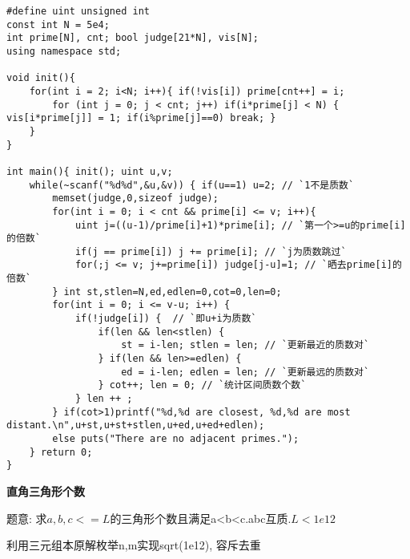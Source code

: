 \begin{lstlisting}
#define uint unsigned int
const int N = 5e4;
int prime[N], cnt; bool judge[21*N], vis[N];
using namespace std;

void init(){
    for(int i = 2; i<N; i++){ if(!vis[i]) prime[cnt++] = i;
        for (int j = 0; j < cnt; j++) if(i*prime[j] < N) { vis[i*prime[j]] = 1; if(i%prime[j]==0) break; }
    }
}

int main(){ init(); uint u,v;
    while(~scanf("%d%d",&u,&v)) { if(u==1) u=2; // `1不是质数`
        memset(judge,0,sizeof judge);
        for(int i = 0; i < cnt && prime[i] <= v; i++){
            uint j=((u-1)/prime[i]+1)*prime[i]; // `第一个>=u的prime[i]的倍数`
            if(j == prime[i]) j += prime[i]; // `j为质数跳过`
            for(;j <= v; j+=prime[i]) judge[j-u]=1; // `晒去prime[i]的倍数`
        } int st,stlen=N,ed,edlen=0,cot=0,len=0;
        for(int i = 0; i <= v-u; i++) {
            if(!judge[i]) {  // `即u+i为质数`
                if(len && len<stlen) {
                    st = i-len; stlen = len; // `更新最近的质数对`
                } if(len && len>=edlen) {
                    ed = i-len; edlen = len; // `更新最远的质数对`
                } cot++; len = 0; // `统计区间质数个数`
            } len ++ ;
        } if(cot>1)printf("%d,%d are closest, %d,%d are most distant.\n",u+st,u+st+stlen,u+ed,u+ed+edlen);
        else puts("There are no adjacent primes.");
    } return 0;
}	
\end{lstlisting}


{\bfseries 直角三角形个数}

题意: 求$a,b,c<=L$的三角形个数且满足a<b<c.abc互质.$ L < 1e12$

利用三元组本原解枚举n,m实现sqrt(1e12), 容斥去重

